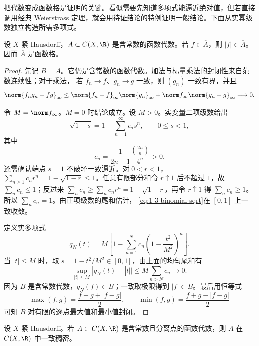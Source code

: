 把代数变成函数格是证明的关键。看似需要先知道多项式能逼近绝对值，但若直接调用经典
Weierstrass 定理，就会用待证结论的特例证明一般结论。下面从实幂级数独立构造所需多项式。

\begin{lemma}[绝对值进入闭包]\label{lemma:1-3-3-1}
设 $X$ 紧 Hausdorff，$A\subset C(X,\R)$ 是含常数的函数代数。若 $f\in\overline A$，则
$|f|\in\overline A$。因而 $\overline A$ 是函数格。
\end{lemma}

\begin{proof}
先记 $B=\overline A$。它仍是含常数的函数代数。加法与标量乘法的封闭性来自范数连续性；对于乘法，
若 $f_n\to f$、$g_n\to g$ 一致，则 $(g_n)$ 一致有界，并且
\[
 \norm{f_ng_n-fg}_\infty
 \le\norm{f_n-f}_\infty\norm{g_n}_\infty
   +\norm f_\infty\norm{g_n-g}_\infty\longrightarrow0.
\]

令 $M=\norm f_\infty$。$M=0$ 时结论成立。设 $M>0$。实变量二项级数给出
\begin{equation}\label{eq:1-3-binomial-sqrt}
 \sqrt{1-s}=1-\sum_{n=1}^\infty c_ns^n,
 \qquad 0\le s<1,
\end{equation}
其中
\[
 c_n=\frac{1}{2n-1}\frac{\binom{2n}{n}}{4^n}>0.
\]
还需确认端点 $s=1$ 不破坏一致逼近。对 $0<r<1$，
$\sum_{n\ge1}c_nr^n=1-\sqrt{1-r}\le1$。任意有限部分和令 $r\uparrow1$ 后不超过 $1$，故
$\sum_nc_n\le1$；反过来
$\sum_nc_n\ge\sum_nc_nr^n=1-\sqrt{1-r}$，再令 $r\uparrow1$ 得
$\sum_nc_n\ge1$。所以 $\sum_nc_n=1$。由正项级数的尾和估计，
\eqref{eq:1-3-binomial-sqrt}在 $[0,1]$ 上一致收敛。

定义实多项式
\[
 q_N(t)=M\left[1-\sum_{n=1}^Nc_n
             \left(1-\frac{t^2}{M^2}\right)^n\right].
\]
当 $|t|\le M$ 时，取 $s=1-t^2/M^2\in[0,1]$，由上面的均匀尾和有
\[
 \sup_{|t|\le M}|q_N(t)-|t||
 \le M\sum_{n>N}c_n\longrightarrow0.
\]
因为 $B$ 是含常数代数，$q_N(f)\in B$；一致取极限得到 $|f|\in B$。最后用恒等式
\[
 \max(f,g)=\frac{f+g+|f-g|}{2},
 \qquad
 \min(f,g)=\frac{f+g-|f-g|}{2}
\]
可知 $B$ 对有限的逐点最大值和最小值封闭。
\end{proof}

\begin{theorem}\label{theorem:1-3-3-2}
设 $X$ 紧 Hausdorff。若 $A\subset C(X,\R)$ 是含常数且分离点的函数代数，则 $A$ 在
$C(X,\R)$ 中一致稠密。
\end{theorem}


